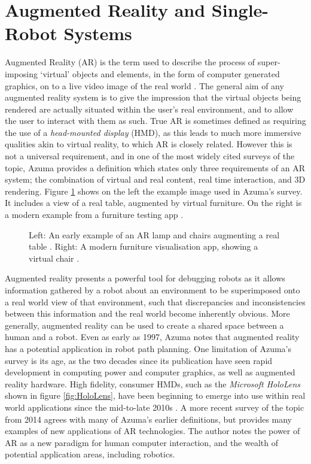 \section{Augmented Reality and Single-Robot Systems} \label{AugmentedReality}
Augmented Reality (AR) is the term used to describe the process of super-imposing `virtual' objects and elements, in the form of computer generated graphics, on to a live video image of the real world \cite{Azuma:1997}. The general aim of any augmented reality system is to give the impression that the virtual objects being rendered are actually situated within the user's real environment, and to allow the user to interact with them as such. True AR is sometimes defined as requiring the use of a \textit{head-mounted display} (HMD), as this leads to much more immersive qualities akin to virtual reality, to which AR is closely related. However this is not a universal requirement, and in one of the most widely cited surveys of the topic, Azuma \cite{Azuma:1997} provides a definition which states only three requirements of an AR system; the combination of virtual and real content, real time interaction, and 3D rendering. Figure \ref{fig:ARFurniture} shows on the left the example image used in Azuma's \cite{Azuma:1997} survey. It includes a view of a real table, augmented by virtual furniture. On the right is a modern example from a furniture testing app \cite{SayDuck}.

\begin{figure}[h]
	\centering
	\decoRule
	\caption[AR visualisations. \cite{Azuma:1997} \cite{SayDuck}]{Left: An early example of an AR lamp and chairs augmenting a real table \cite{Azuma:1997}. Right: A modern furniture visualisation app, showing a virtual chair \cite{SayDuck}.}
	\label{fig:ARFurniture}
\end{figure}

Augmented reality presents a powerful tool for debugging robots as it allows information gathered by a robot about an environment to be superimposed onto a real world view of that environment, such that discrepancies and inconsistencies between this information and the real world become inherently obvious. More generally, augmented reality can be used to create a shared space between a human and a robot. Even as early as 1997, Azuma \cite{Azuma:1997} notes that augmented reality has a potential application in robot path planning. One limitation of Azuma's survey is its age, as the two decades since its publication have seen rapid development in computing power and computer graphics, as well as augmented reality hardware. High fidelity, consumer HMDs, such as the \textit{Microsoft HoloLens} shown in figure \ref{fig:HoloLens}, have been beginning to emerge into use within real world applications since the mid-to-late 2010s \cite{HoloLens}. A more recent survey of the topic from 2014 \cite{Billinghurst:2014} agrees with many of Azuma's earlier definitions, but provides many examples of new applications of AR technologies. The author notes the power of AR as a new paradigm for human computer interaction, and the wealth of potential application areas, including robotics.


